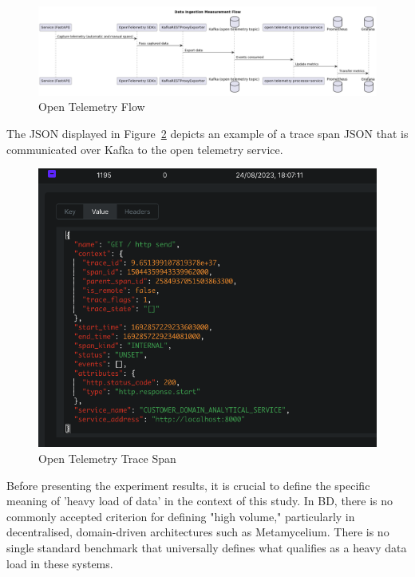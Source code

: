 \documentclass[preprint,12pt]{elsarticle}
\begin{document}
\begin{figure}[h!]
  \centering
  \includegraphics[width=\textwidth]{images/open-telemetry-flow.png}
  \caption{Open Telemetry Flow}
  \label{openTelemetryFlow}
\end{figure}

The JSON displayed in Figure~\ref{openTelemetryTraceSpan} depicts an example of a trace span JSON that is communicated over Kafka to the open telemetry service.

\begin{figure}[h!]
  \centering
  \includegraphics[width=\textwidth]{images/open-telemetry-trace-example.png}
  \caption{Open Telemetry Trace Span}
  \label{openTelemetryTraceSpan}
\end{figure}

Before presenting the experiment results, it is crucial to define the specific meaning of 'heavy load of data' in the context of this study. In BD, there is no commonly accepted criterion for defining "high volume," particularly in decentralised, domain-driven architectures such as Metamycelium. There is no single standard benchmark that universally defines what qualifies as a heavy data load in these systems. 
\end{document}
